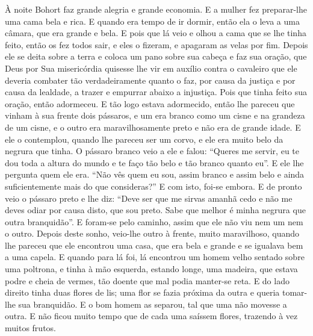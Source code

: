 À noite Bohort faz grande alegria e grande economia. E a mulher fez preparar-lhe
uma cama bela e rica. E quando era tempo de ir dormir, então ela o leva a uma
câmara, que era grande e bela. E pois que lá veio e olhou a cama que se lhe
tinha feito, então os fez todos sair, e eles o fizeram, e apagaram as velas por
fim. Depois ele se deita sobre a terra e coloca um pano sobre sua cabeça e faz
sua oração, que Deus por Sua misericórdia quisesse lhe vir em auxílio contra o
cavaleiro que ele deveria combater tão verdadeiramente quanto o faz, por causa
da justiça e por causa da lealdade, a trazer e empurrar abaixo a injustiça.
Pois que tinha feito sua oração, então adormeceu. E tão logo estava adormecido,
então lhe pareceu que vinham à sua frente dois pássaros, e um era branco como
um cisne e na grandeza de um cisne, e o outro era maravilhosamente preto e não
era de grande idade. E ele o contemplou, quando lhe pareceu ser um corvo, e ele
era muito belo da negrura que tinha. O pássaro branco veio a ele e falou:
``Queres me servir, eu te dou toda a altura do mundo e te faço tão belo e tão
branco quanto eu”. E ele lhe pergunta quem ele era. “Não vês quem eu sou, assim
branco e assim belo e ainda suficientemente mais do que consideras?” E com
isto, foi-se embora. E de pronto veio o pássaro preto e lhe diz: “Deve ser que
me sirvas amanhã cedo e não me deves odiar por causa disto, que sou preto. Sabe
que melhor é minha negrura que outra branquidão”. E foram-se pelo caminho,
assim que ele não viu nem um nem o outro. Depois deste sonho, veio-lhe outro à
frente, muito maravilhoso, quando lhe pareceu que ele encontrou uma casa, que
era bela e grande e se igualava bem a uma capela. E quando para lá foi, lá
encontrou um homem velho sentado sobre uma poltrona, e tinha à mão esquerda, 
estando longe, uma madeira, que estava podre e cheia de vermes, tão doente que
mal podia manter-se reta. E do lado direito tinha duas flores de lis; uma flor
se fazia próxima da outra e queria tomar-lhe sua branquidão. E o bom homem as
separou, tal que uma não movesse a outra. E não ficou muito tempo que de cada
uma saíssem flores, trazendo à vez muitos frutos.

